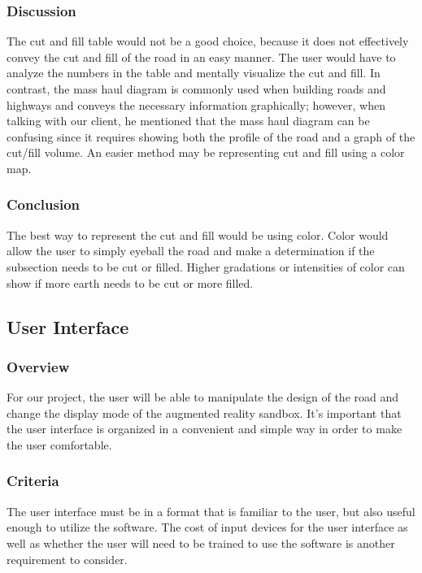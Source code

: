 \subsubsection{Discussion}
The cut and fill table would not be a good choice, because it does not effectively convey the cut and fill of the road in an easy manner.
The user would have to analyze the numbers in the table and mentally visualize the cut and fill.
In contrast, the mass haul diagram is commonly used when building roads and highways and conveys the necessary information graphically; however, when talking with our client, he mentioned that the mass haul diagram can be confusing since it requires showing both the profile of the road and a graph of the cut/fill volume.
An easier method may be representing cut and fill using a color map.

\subsubsection{Conclusion}
The best way to represent the cut and fill would be using color.
Color would allow the user to simply eyeball the road and make a determination if the subsection needs to be cut or filled.
Higher gradations or intensities of color can show if more earth needs to be cut or more filled.

\subsection{User Interface}
\subsubsection{Overview}
For our project, the user will be able to manipulate the design of the road and change the display mode of the augmented reality sandbox.
It's important that the user interface is organized in a convenient and simple way in order to make the user comfortable.

\subsubsection{Criteria}
The user interface must be in a format that is familiar to the user, but also useful enough to utilize the software.
The cost of input devices for the user interface as well as whether the user will need to be trained to use the software is another requirement to consider.

